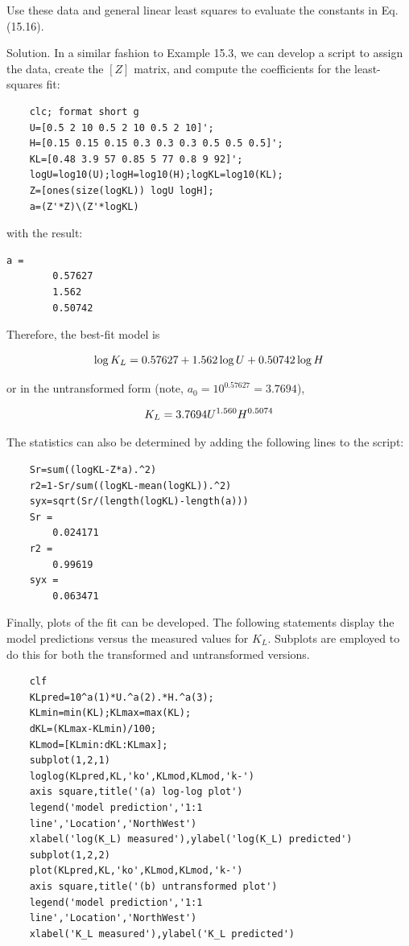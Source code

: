 \documentclass[../main.tex]{subfiles}
\begin{document}
\noindent Use these data and general linear least squares to evaluate the constants in Eq. (15.16).

\noindent Solution. In a similar fashion to Example 15.3, we can develop a script to assign the
data, create the $[Z]$ matrix, and compute the coefficients for the least-squares fit:

\begin{lstlisting}[numbers=none]
	% Compute best fit of transformed values
	clc; format short g
	U=[0.5 2 10 0.5 2 10 0.5 2 10]';
	H=[0.15 0.15 0.15 0.3 0.3 0.3 0.5 0.5 0.5]';
	KL=[0.48 3.9 57 0.85 5 77 0.8 9 92]';
	logU=log10(U);logH=log10(H);logKL=log10(KL);
	Z=[ones(size(logKL)) logU logH];
	a=(Z'*Z)\(Z'*logKL)
\end{lstlisting}

\noindent with the result:

\begin{lstlisting}[numbers=none]
	a =
		0.57627
		1.562
		0.50742
\end{lstlisting}

\noindent Therefore, the best-fit model is

\begin{equation}
	\notag
	\log K_L = 0.57627 + 1.562 \log U + 0.50742 \log H
\end{equation}

\noindent or in the untransformed form (note, $a_0 = 10^{0.57627} = 3.7694$),

\begin{equation}
	\notag
	K_L = 3.7694 U^{1.560} H ^ {0.5074}
\end{equation}

\noindent The statistics can also be determined by adding the following lines to the script:

\begin{lstlisting}[numbers=none]
	% Compute fit statistics
	Sr=sum((logKL-Z*a).^2)
	r2=1-Sr/sum((logKL-mean(logKL)).^2)
	syx=sqrt(Sr/(length(logKL)-length(a)))
	Sr =
		0.024171
	r2 =
		0.99619
	syx =
		0.063471
\end{lstlisting}

Finally, plots of the fit can be developed. The following statements display the model
predictions versus the measured values for $K_L$. Subplots are employed to do this for both
the transformed and untransformed versions.

\begin{lstlisting}[numbers=none]
	%Generate plots
	clf
	KLpred=10^a(1)*U.^a(2).*H.^a(3);
	KLmin=min(KL);KLmax=max(KL);
	dKL=(KLmax-KLmin)/100;
	KLmod=[KLmin:dKL:KLmax];
	subplot(1,2,1)
	loglog(KLpred,KL,'ko',KLmod,KLmod,'k-')
	axis square,title('(a) log-log plot')
	legend('model prediction','1:1
	line','Location','NorthWest')
	xlabel('log(K_L) measured'),ylabel('log(K_L) predicted')
	subplot(1,2,2)
	plot(KLpred,KL,'ko',KLmod,KLmod,'k-')
	axis square,title('(b) untransformed plot')
	legend('model prediction','1:1
	line','Location','NorthWest')
	xlabel('K_L measured'),ylabel('K_L predicted')
\end{lstlisting}
\end{document}
